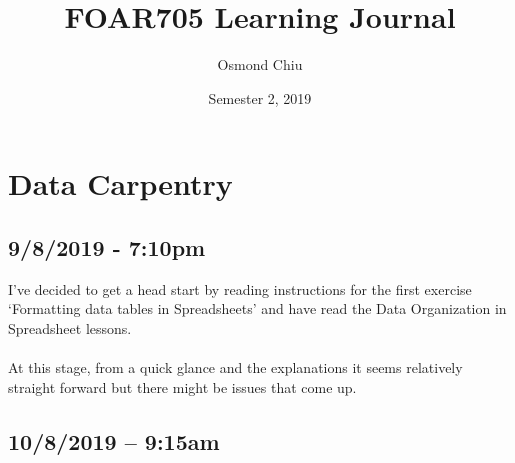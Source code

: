 \documentclass{article}
\title{FOAR705 Learning Journal}
\author{Osmond Chiu}
\date{Semester 2, 2019}
\begin{document}
\maketitle
\tableofcontents

\section{Data Carpentry}
\subsection*{9/8/2019 - 7:10pm}
I’ve decided to get a head start by reading instructions for the first exercise ‘Formatting data tables in Spreadsheets’ and have read the Data Organization in Spreadsheet lessons.\\
\\
At this stage, from a quick glance and the explanations it seems relatively straight forward but there might be issues that come up.\par
\subsection*{10/8/2019 – 9:15am}
\end{document}
